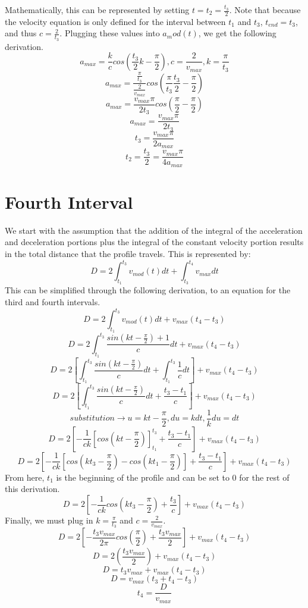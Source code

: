 \documentclass[a4paper,12pt]{report}
\newcommand{\tab}{\hspace{20pt}}
\begin{document}
	\tab Mathematically, this can be represented by setting $t = t_2 = \frac{t_3}{2}$. Note that because the velocity equation is only defined for the interval between $t_1$ and $t_3$, $t_{end} = t_3$, and thus $c = \frac{2}{t_3}$. Plugging these values into $a_mod(t)$, we get the following derivation.
	\[a_{max} = \frac{k}{c} cos(\frac{t_3}{2} k - \frac{\pi}{2}), c = \frac{2}{v_{max}}, k = \frac{\pi}{t_{3}}\]
	\[a_{max} = \frac{\frac{\pi}{t_3}}{\frac{2}{v_{max}}} cos(\frac{\pi}{t_3} \frac{t_3}{2} - \frac{\pi}{2})\]
	\[a_{max} = \frac{v_{max}\pi}{2t_3} cos(\frac{\pi}{2} - \frac{\pi}{2})\]
	\[a_{max} = \frac{v_{max}\pi}{2t_3}\]
	\[t_3 = \frac{v_{max}\pi}{2a_{max}}\]
	\[t_2 = \frac{t_3}{2} = \frac{v_{max}\pi}{4a_{max}}\]
	
	\section{Fourth Interval}
	\tab We start with the assumption that the addition of the integral of the acceleration and deceleration portions plus the integral of the constant velocity portion results in the total distance that the profile travels. This is represented by:
	\[D = 2\int_{t_1}^{t_3}v_{mod}(t)dt + \int_{t_3}^{t_4}v_{max}dt\]
	\tab This can be simplified through the following derivation, to an equation for the third and fourth intervals.
	\[D = 2\int_{t_1}^{t_3}v_{mod}(t)dt + v_{max}(t_4 - t_3)\]
	\[D = 2\int_{t_1}^{t_3}\frac{sin(kt - \frac{\pi}{2}) + 1}{c}dt + v_{max}(t_4 - t_3)\]
	\[D = 2\left[\int_{t_1}^{t_3}\frac{sin(kt - \frac{\pi}{2})}{c}dt + \int_{t_1}^{t_3}\frac{1}{c}dt\right] + v_{max}(t_4 - t_3)\]
	\[D = 2\left[\int_{t_1}^{t_3}\frac{sin(kt - \frac{\pi}{2})}{c}dt + \frac{t_3 - t_1}{c}\right] + v_{max}(t_4 - t_3)\]
	\[substitution \rightarrow u = kt - \frac{\pi}{2}, du = kdt, \frac{1}{k}du = dt\]
	\[D = 2\left[-\frac{1}{ck}\left[cos(kt - \frac{\pi}{2})\right]_{t_1}^{t_3} + \frac{t_3 - t_1}{c}\right] + v_{max}(t_4 - t_3)\]
	\[D = 2\left[-\frac{1}{ck}\left[cos(kt_3 - \frac{\pi}{2}) - cos(kt_1 - \frac{\pi}{2})\right] + \frac{t_3 - t_1}{c}\right] + v_{max}(t_4 - t_3)\]
	\tab From here, $t_1$ is the beginning of the profile and can be set to 0 for the rest of this derivation.
	\[D = 2\left[-\frac{1}{ck}cos(kt_3 - \frac{\pi}{2}) + \frac{t_3}{c}\right] + v_{max}(t_4 - t_3)\]
	\tab Finally, we must plug in $k = \frac{\pi}{t_3}$ and $c = \frac{2}{v_{max}}$.
	\[D = 2\left[-\frac{t_3v_{max}}{2\pi}cos(\frac{\pi}{2}) + \frac{t_3v_{max}}{2}\right] + v_{max}(t_4 - t_3)\]
	\[D = 2(\frac{t_3v_{max}}{2}) + v_{max}(t_4 - t_3)\]
	\[D = t_3v_{max} + v_{max}(t_4 - t_3)\]
	\[D = v_{max}(t_3 + t_4 - t_3)\]
	\[t_4 = \frac{D}{v_{max}}\]
	
\end{document}
